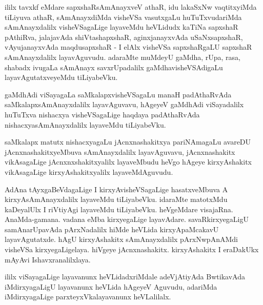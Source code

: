 \begin{artha}
ililx tavxkf eMdare sapxshaRsAmAnayxveV athaR, idu lakaSxNw
vaqtitxyiMda tiLiyuva athaR, sAmAnayxdiMda visheVSa vasutxgaLu
huTuTxvudariMda sAmAnayxdalilx visheVSagaLige layaveMdu heVLidudx
kaTiNa sapxshaR pAthiRva, jalajavAda shiVtashapxshaR, aginxjanayxvAda
uSaNxsapxshaR, vAyujanayxvAda maqdusapxshaR - I elAlx visheVSa
sapxshaRgaLU sapxshaR sAmAnayxdalilx layavAguvudu. adaraMte muMdeyU
gaMdha, rUpa, rasa, shabadx ivugaLa sAmAnayx savxrUpadalilx
gaMdhavisheVSAdigaLu layavAgutatxveyeMdu tiLiyabeVku.
\end{artha}

\begin{artha}
gaMdhAdi viSayagaLa saMkalapxvisheVSagaLu manaH padAthaRvAda
saMkalapxsAmAnayxdalilx layavAguvavu, hAgeyeV gaMdhAdi viSayadalilx
huTuTxva nishacxya visheVSagaLige haqdaya padAthaRvAda
nishacxyasAmAnayxdalilx layaveMdu tiLiyabeVku.
\end{artha}

\begin{artha}
saMkalapx matutx nishacxyagaLu jAcnxnashakitxya pariNAmagaLu avareDU
jAcnxnashakitxyeMbuva sAmAnayxdalilx layavAguvavu, jAcnxnashakitx
vikAsagaLige jAcnxnxshakitxyalilx layaveMbudu heVgo hAgeye
kirxyAshakitx vikAsagaLige kirxyAshakitxyalilx layaveMdAguvudu.
\end{artha}

\begin{artha}
AdAna tAyxgaBeVdagaLige I kirxyAvisheVSagaLige hasatxveMbuva A
kirxyAsAmAnayxdalilx layaveMdu tiLiyabeVku. idaraMte matotxMdu
kaDeyalUlx I riVtiyAgi layaveMdu tiLiyabeVku. heVgeMdare
visajaRna. AnaMda-gamana. vadana eMba kirxyegaLige
layavAdare. savaRkirxyegaLigU samAnarUpavAda pArxNadalilx hiMde heVLida kirxyApaMcakavU layavAgutatxde. hAgU
kirxyAshakitx sAmAnayxdalilx pArxNwpAnAMdi visheVSa
kirxyegaLigelaya. hiVgeye jAcnxnashakitx. kirxyAshakitx I eraDakUkx
mAyAvi Ishavxranalilxlaya.

ililx viSayagaLige layavanunx heVLidadxriMdale adeVjAtiyAda
BwtikavAda iMdirxyagaLigU layavanunx heVLida hAgeyeV Aguvudu, adariMda
iMdirxyagaLige parxteyxVkalayavanunx heVLalilalx.
\end{artha}

